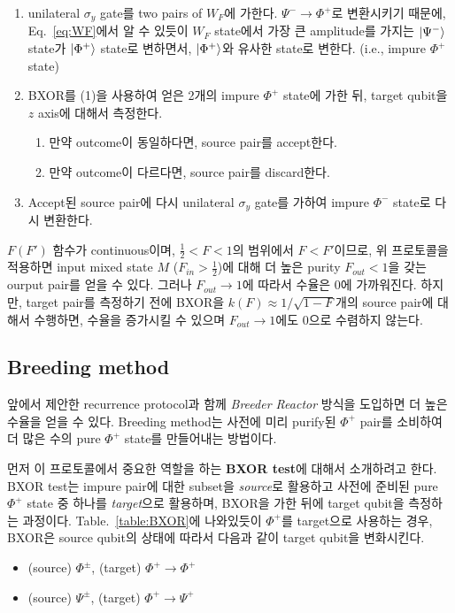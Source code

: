 \documentclass[
]{kaohandt}
\begin{document}
\begin{enumerate}
    \item unilateral $\sigma_y$ gate를 two pairs of $W_F$에 가한다. $\Psi^{-} \rightarrow \Phi^{+}$로 변환시키기 때문에, Eq.~\eqref{eq:WF}에서 알 수 있듯이 $W_F$ state에서 가장 큰 amplitude를 가지는 $\ket{\Psi^-}$ state가 $\ket{\Phi^+}$ state로 변하면서, $\ket{\Phi^+}$와 유사한 state로 변한다. (i.e., impure $\Phi^+$ state)
    \item BXOR를 (1)을 사용하여 얻은 2개의 impure $\Phi^+$ state에 가한 뒤, target qubit을 $z$ axis에 대해서 측정한다. 
    \begin{enumerate}
        \item 만약 outcome이 동일하다면, source pair를 accept한다.
        \item 만약 outcome이 다르다면, source pair를 discard한다.
    \end{enumerate}
    \item Accept된 source pair에 다시 unilateral $\sigma_y$ gate를 가하여 impure $\Phi^-$ state로 다시 변환한다. 
\end{enumerate}

$F(F')$ 함수가 continuous이며, $\frac{1}{2} < F< 1$의 범위에서 $F < F'$이므로, 위 프로토콜을 적용하면 input mixed state $M$ ($F_{in} > \frac{1}{2}$)에 대해 더 높은 purity $F_{out} <1$을 갖는 ourput pair를 얻을 수 있다.
그러나 $F_{out} \rightarrow 1$에 따라서 수율은 0에 가까워진다. 하지만, target pair를 측정하기 전에 BXOR을 $k(F) \approx 1/\sqrt{1-F}$개의 source pair에 대해서 수행하면, 수율을 증가시킬 수 있으며 $F_{out} \rightarrow 1$에도 0으로 수렴하지 않는다.

\subsection{Breeding method}
앞에서 제안한 recurrence protocol과 함께 \textit{Breeder Reactor} 방식을 도입하면 더 높은 수율을 얻을 수 있다. Breeding method는 사전에 미리 purify된 $\Phi^+$ pair를 소비하여 더 많은 수의 pure $\Phi^+$ state를 만들어내는 방법이다.

먼저 이 프로토콜에서 중요한 역할을 하는 \textbf{BXOR test}에 대해서 소개하려고 한다. BXOR test는 impure pair에 대한 subset을 \textit{source}로 활용하고 사전에 준비된 pure $\Phi^+$ state 중 하나를 \textit{target}으로 활용하며, BXOR을 가한 뒤에 target qubit을 측정하는 과정이다. Table.~\ref{table:BXOR}에 나와있듯이 $\Phi^+$를 target으로 사용하는 경우, BXOR은 source qubit의 상태에 따라서 다음과 같이 target qubit을 변화시킨다.
\begin{itemize}
    \item (source) $\Phi^{\pm}$, (target) $\Phi^{+} \rightarrow \Phi^{+}$
    \item (source) $\Psi^{\pm}$, (target) $\Phi^{+} \rightarrow \Psi^{+}$
\end{itemize}
\end{document}
